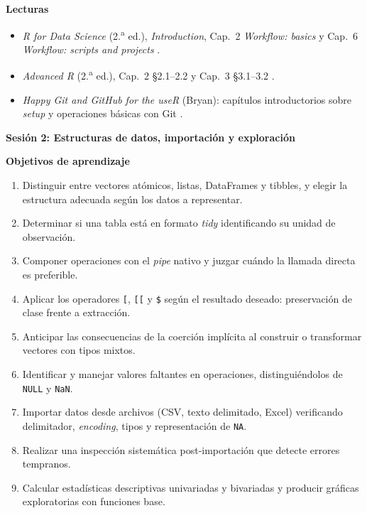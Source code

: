 \documentclass[11pt,letterpaper]{article}
\newcommand{\sesion}[2]{%
  \bigskip%
  {\color{main}\Large\bfseries Sesión #1: #2\par}%
  \smallskip%
}
\begin{document}
\medskip
\noindent\textbf{Lecturas}
\begin{itemize}[leftmargin=*, itemsep=1pt]
    \item \textit{R for Data Science} (2.\textsuperscript{a} ed.), \textit{Introduction}, Cap.\ 2 \textit{Workflow: basics} y Cap.\ 6 \textit{Workflow: scripts and projects} \cite{wickham2023r4ds}.
    \item \textit{Advanced R} (2.\textsuperscript{a} ed.), Cap.\ 2 §2.1--2.2 y Cap.\ 3 §3.1--3.2 \cite{wickham2019advr}.
    \item \textit{Happy Git and GitHub for the useR} (Bryan): capítulos introductorios sobre \textit{setup} y operaciones básicas con Git \cite{bryan-happygit}.
\end{itemize}

\sesion{2}{Estructuras de datos, importación y exploración}
\medskip
\noindent\textbf{Objetivos de aprendizaje}
\begin{enumerate}[leftmargin=*, itemsep=1pt]
    \item Distinguir entre vectores atómicos, listas, DataFrames y tibbles, y elegir la estructura adecuada según los datos a representar.
    \item Determinar si una tabla está en formato \textit{tidy} identificando su unidad de observación.
    \item Componer operaciones con el \textit{pipe} nativo y juzgar cuándo la llamada directa es preferible.
    \item Aplicar los operadores \texttt{[}, \texttt{[[} y \texttt{\$} según el resultado deseado: preservación de clase frente a extracción.
    \item Anticipar las consecuencias de la coerción implícita al construir o transformar vectores con tipos mixtos.
    \item Identificar y manejar valores faltantes en operaciones, distinguiéndolos de \texttt{NULL} y \texttt{NaN}.
    \item Importar datos desde archivos (CSV, texto delimitado, Excel) verificando delimitador, \textit{encoding}, tipos y representación de \texttt{NA}.
    \item Realizar una inspección sistemática post-importación que detecte errores tempranos.
    \item Calcular estadísticas descriptivas univariadas y bivariadas y producir gráficas exploratorias con funciones base.
\end{enumerate}
\end{document}
